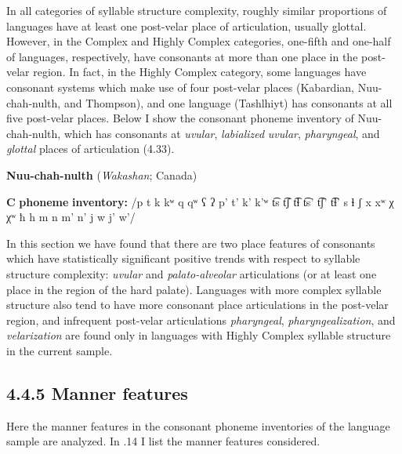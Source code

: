   In all categories of syllable structure complexity, roughly similar proportions of languages have at least one post-velar place of articulation, usually glottal. However, in the Complex and Highly Complex categories, one-fifth and one-half of languages, respectively, have consonants at more than one place in the post-velar region. In fact, in the Highly Complex category, some languages have consonant systems which make use of four post-velar places (Kabardian, Nuu-chah-nulth, and Thompson), and one language (Tashlhiyt) has consonants at all five post-velar places. Below I show the consonant phoneme inventory of Nuu-chah-nulth, which has consonants at \textit{uvular}, \textit{labialized} \textit{uvular}, \textit{pharyngeal}, and \textit{glottal} places of articulation (4.33).

\ea\label{ex:(4.33)}
  \textbf{Nuu-chah-nulth} (\textit{Wakashan}; Canada)

\textbf{C} \textbf{phoneme} \textbf{inventory:} /p t k kʷ q qʷ ʕ ʔ p’ t’ k’ k’ʷ t͡s t͡ʃ t͡ɬ t͡s’ t͡ʃ’ t͡ɬ’ s ɬ ʃ x xʷ χ χʷ ħ h m n m’ n’ j w j’ w’/

\z

  In this section we have found that there are two place features of consonants which have statistically significant positive trends with respect to syllable structure complexity: \textit{uvular} and \textit{palato-alveolar} articulations (or at least one place in the region of the hard palate). Languages with more complex syllable structure also tend to have more consonant place articulations in the post-velar region, and infrequent post-velar articulations \textit{pharyngeal}, \textit{pharyngealization}, and \textit{velarization} are found only in languages with Highly Complex syllable structure in the current sample.

\subsection{4.4.5 Manner features}

  Here the manner features in the consonant phoneme inventories of the language sample are analyzed. In .14 I list the manner features considered.

